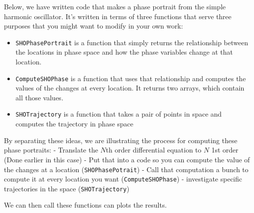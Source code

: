 Below, we have written code that makes a phase portrait from the simple
harmonic oscillator. It's written in terms of three functions that serve
three purposes that you might want to modify in your own work:

\begin{itemize}
\tightlist
\item
  \texttt{SHOPhasePortrait} is a function that simply returns the
  relationship between the locations in phase space and how the phase
  variables change at that location.
\item
  \texttt{ComputeSHOPhase} is a function that uses that relationship and
  computes the values of the changes at every location. It returns two
  arrays, which contain all those values.
\item
  \texttt{SHOTrajectory} is a function that takes a pair of points in
  space and computes the trajectory in phase space
\end{itemize}

By separating these ideas, we are illustrating the process for computing
these phase portraits: - Translate the \(N\)th order differential
equation to \(N\) 1st order (Done earlier in this case) - Put that into
a code so you can compute the value of the changes at a location
(\texttt{SHOPhasePotrait}) - Call that computation a bunch to compute it
at every location you want (\texttt{ComputeSHOPhase}) - investigate
specific trajectories in the space (\texttt{SHOTrajectory})

We can then call these functions can plots the results.

\begin{Shaded}
\begin{Highlighting}[]
    
\OperatorTok{=}\NormalTok{ [vx, }\OperatorTok{{-}}\OperatorTok{*}\OperatorTok{**}\OperatorTok{*}\NormalTok{x] }
    
\end{Highlighting}
\end{Shaded}

